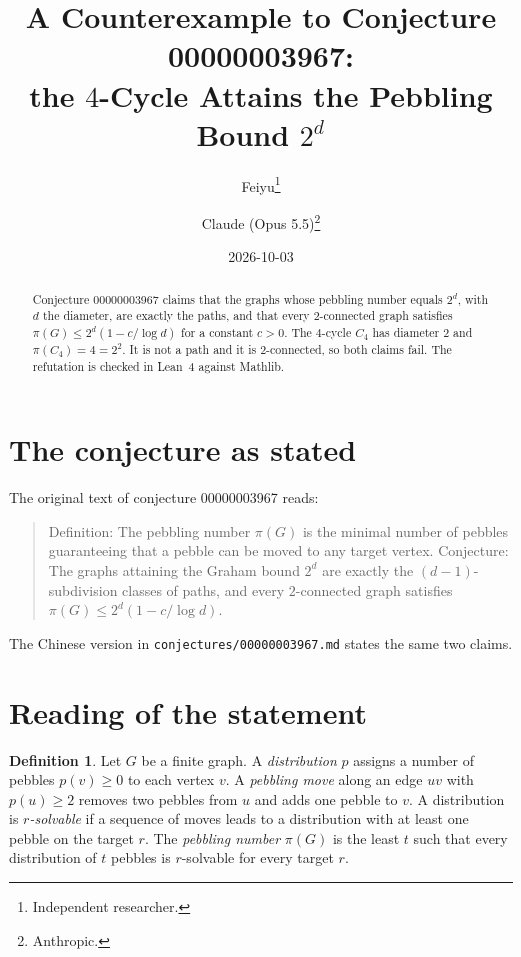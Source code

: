 \documentclass[11pt]{article}
\title{A Counterexample to Conjecture 00000003967:\\
the $4$-Cycle Attains the Pebbling Bound $2^d$}
\author{%
  Feiyu\thanks{Independent researcher.}
  \and
  Claude (Opus 5.5)\thanks{Anthropic.}%
}
\date{2026-10-03}
\theoremstyle{plain}
\theoremstyle{definition}
\newtheorem{definition}[theorem]{Definition}
\theoremstyle{remark}
\begin{document}
\maketitle

\begin{abstract}
Conjecture 00000003967 claims that the graphs whose pebbling number equals $2^d$, with
$d$ the diameter, are exactly the paths, and that every $2$-connected graph satisfies
$\pi(G)\le2^d(1-c/\log d)$ for a constant $c>0$. The $4$-cycle $C_4$ has diameter
$2$ and $\pi(C_4)=4=2^2$. It is not a path and it is $2$-connected, so both claims
fail. The refutation is checked in Lean~4 against Mathlib.
\end{abstract}

\section{The conjecture as stated}

The original text of conjecture 00000003967 reads:

\begin{quote}
Definition: The pebbling number $\pi(G)$ is the minimal number of pebbles guaranteeing
that a pebble can be moved to any target vertex. Conjecture: The graphs attaining the
Graham bound $2^d$ are exactly the $(d-1)$-subdivision classes of paths, and every
$2$-connected graph satisfies $\pi(G) \le 2^d (1 - c/\log d)$.
\end{quote}

The Chinese version in \texttt{conjectures/00000003967.md} states the same two
claims.

\section{Reading of the statement}

\begin{definition}
Let $G$ be a finite graph. A \emph{distribution} $p$ assigns a number of pebbles
$p(v)\ge0$ to each vertex $v$. A \emph{pebbling move} along an edge $uv$ with
$p(u)\ge2$ removes two pebbles from $u$ and adds one pebble to $v$. A distribution is
\emph{$r$-solvable} if a sequence of moves leads to a distribution with at least one
pebble on the target $r$. The \emph{pebbling number} $\pi(G)$ is the least $t$ such
that every distribution of $t$ pebbles is $r$-solvable for every target $r$.
\end{definition}
\end{document}
